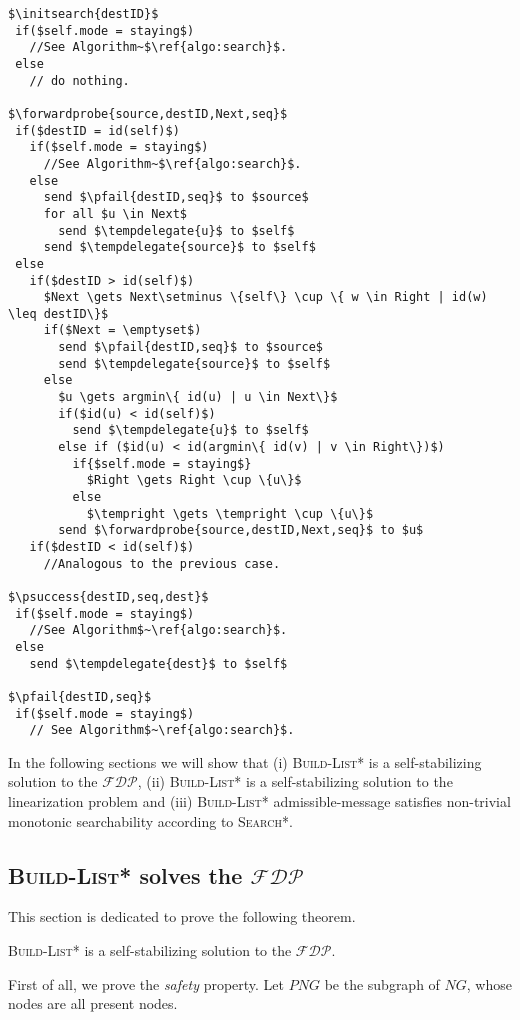 \documentclass[a4paper,USenglish]{lipics}
\newcommand{\blpp}{\textsc{Build-List*}\xspace}
\newcommand{\srpp}{\textsc{Search*}\xspace}
\newcommand{\tempdelegate}[1]{\textsc{TempDelegate(\ensuremath{#1})}\xspace}
\newcommand{\initsearch}[1]{\textsc{InitiateNewSearch(\ensuremath{#1})}\xspace}
\newcommand{\forwardprobe}[1]{\textsc{ForwardProbe(\ensuremath{#1})}\xspace}
\newcommand{\psuccess}[1]{\textsc{ProbeSuccess(\ensuremath{#1})}\xspace}
\newcommand{\pfail}[1]{\textsc{ProbeFail(\ensuremath{#1})}\xspace}
\newcommand{\fdp}{$\mathcal{FDP}$\xspace}
\newcommand{\tempright}[1][]{\ensuremath{Temp_{R}\ifthenelse{\isempty{#1}}{}{(#1)}}\xspace}
\begin{document}
\newpage
\begin{lstlisting}[mathescape=true,caption=\srpp protocol,label=algo:search2]
$\initsearch{destID}$
 if($self.mode = staying$) 
   //See Algorithm~$\ref{algo:search}$.
 else
   // do nothing.  

$\forwardprobe{source,destID,Next,seq}$
 if($destID = id(self)$)
   if($self.mode = staying$) 
     //See Algorithm~$\ref{algo:search}$.
   else
     send $\pfail{destID,seq}$ to $source$
     for all $u \in Next$ 
       send $\tempdelegate{u}$ to $self$
     send $\tempdelegate{source}$ to $self$
 else
   if($destID > id(self)$)
     $Next \gets Next\setminus \{self\} \cup \{ w \in Right | id(w) \leq destID\}$
     if($Next = \emptyset$)
       send $\pfail{destID,seq}$ to $source$
       send $\tempdelegate{source}$ to $self$
     else
       $u \gets argmin\{ id(u) | u \in Next\}$
       if($id(u) < id(self)$)
         send $\tempdelegate{u}$ to $self$
       else if ($id(u) < id(argmin\{ id(v) | v \in Right\})$)
         if{$self.mode = staying$}
           $Right \gets Right \cup \{u\}$
         else
           $\tempright \gets \tempright \cup \{u\}$
       send $\forwardprobe{source,destID,Next,seq}$ to $u$
   if($destID < id(self)$) 
     //Analogous to the previous case.

$\psuccess{destID,seq,dest}$
 if($self.mode = staying$) 
   //See Algorithm$~\ref{algo:search}$.
 else
   send $\tempdelegate{dest}$ to $self$

$\pfail{destID,seq}$
 if($self.mode = staying$) 
   // See Algorithm$~\ref{algo:search}$.
\end{lstlisting}

In the following sections we will show that (i) \blpp is a self-stabilizing solution to the \fdp, (ii) \blpp is a self-stabilizing solution to the linearization problem and (iii) \blpp admissible-message satisfies non-trivial monotonic searchability according to \srpp.

\subsection{\blpp solves the \fdp}
\label{sec:FDP_solution_proof}
This section is dedicated to prove the following theorem.

\begin{theorem}\label{thm:blpp_solves_fdp}
 \blpp is a self-stabilizing solution to the \fdp.
\end{theorem}

First of all, we prove the \emph{safety} property. Let $PNG$ be the subgraph of $NG$, whose nodes are all present nodes. 
\end{document}
